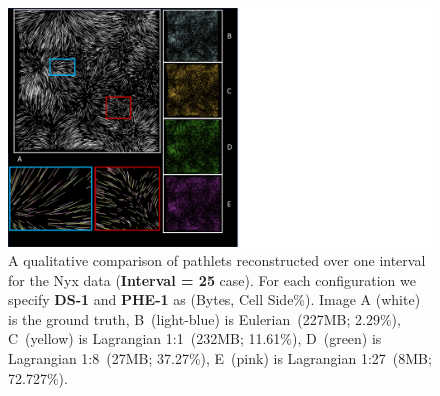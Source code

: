 \begin{figure}[t]
\centering
\includegraphics[width=0.87\linewidth, trim={0cm 1cm 15.5cm 0cm}, clip]{images/Nyx_Vis.pdf}
\vspace{-3mm}
\caption{A qualitative comparison of pathlets reconstructed over one interval for the Nyx data (\textbf{Interval = 25} case). For each configuration we specify \textbf{DS-1} and \textbf{PHE-1} as (Bytes, Cell Side\%). Image A (white) is the ground truth, B~(light-blue) is Eulerian~(227MB; 2.29\%), C~(yellow) is Lagrangian 1:1~(232MB; 11.61\%), D~(green) is Lagrangian 1:8~(27MB; 37.27\%), E~(pink) is Lagrangian 1:27~(8MB; 72.727\%).} 
\label{fig:nyx_vis}
\vspace{-5mm}
\end{figure}
